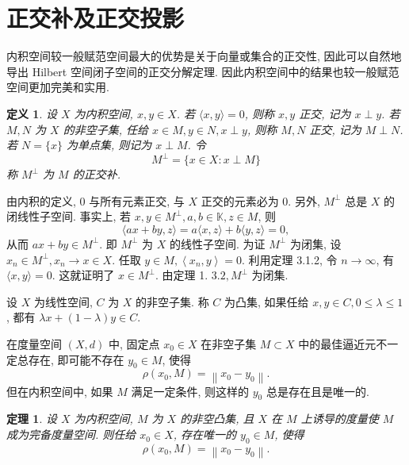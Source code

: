 \documentclass[openany]{ctexbook}
\theoremstyle{kaiti}
\newtheorem{definition}{定义}[section]
\newtheorem{theorem}{定理}[section]
\theoremstyle{normal}
\begin{document}
\section{正交补及正交投影}

内积空间较一般赋范空间最大的优势是关于向量或集合的正交性, 因此可以自然地导出 Hilbert 空间闭子空间的正交分解定理. 因此内积空间中的结果也较一般赋范空间更加完美和实用.

\begin{definition}
设 $X$ 为内积空间, $x, y \in X$. 若 $\langle x, y\rangle=0$, 则称 $x, y$ 正交, 记为 $x \perp y$. 若 $M, N$ 为 $X$ 的非空子集, 任给 $x \in M, y \in N, x \perp y$, 则称 $M, N$ 正交, 记为 $M \perp N$. 若 $N=\{x\}$ 为单点集, 则记为 $x \perp M$. 令
$$
M^{\perp}=\{x \in X: x \perp M\}
$$
称 $M^{\perp}$ 为 $M$ 的正交补.
\end{definition}

由内积的定义, 0 与所有元素正交, 与 $X$ 正交的元素必为 0. 另外, $M^{\perp}$ 总是 $X$ 的闭线性子空间. 事实上, 若 $x, y \in M^{\perp}, a, b \in \mathbb{K}, z \in M$, 则
$$
\langle a x+b y, z\rangle=a\langle x, z\rangle+b\langle y, z\rangle=0,
$$
从而 $a x+b y \in M^{\perp}$. 即 $M^{\perp}$ 为 $X$ 的线性子空间. 为证 $M^{\perp}$ 为闭集, 设 $x_n \in M^{\perp}, x_n \rightarrow x \in X$. 任取 $y \in M,\left\langle x_n, y\right\rangle=0$. 利用定理 3.1.2, 令 $n \rightarrow \infty$, 有 $\langle x, y\rangle=0$. 这就证明了 $x \in M^{\perp}$. 由定理 1. $3.2, M^{\perp}$ 为闭集.

设 $X$ 为线性空间, $C$ 为 $X$ 的非空子集. 称 $C$ 为凸集, 如果任给 $x, y \in C, 0 \leqslant \lambda \leqslant 1$, 都有 $\lambda x+(1-\lambda) y \in C$.

在度量空间 $(X, d)$ 中, 固定点 $x_0 \in X$ 在非空子集 $M \subset X$ 中的最佳逼近元不一定总存在, 即可能不存在 $y_0 \in M$, 使得
$$
\rho\left(x_0, M\right)=\left\|x_0-y_0\right\|.
$$
但在内积空间中, 如果 $M$ 满足一定条件, 则这样的 $y_0$ 总是存在且是唯一的.

\begin{theorem}
  设 $X$ 为内积空间, $M$ 为 $X$ 的非空凸集, 且 $X$ 在 $M$ 上诱导的度量使 $M$ 成为完备度量空间. 则任给 $x_0 \in X$, 存在唯一的 $y_0 \in M$, 使得
  $$
  \rho\left(x_0, M\right)=\left\|x_0-y_0\right\|.
  $$
\end{theorem}
\end{document}
